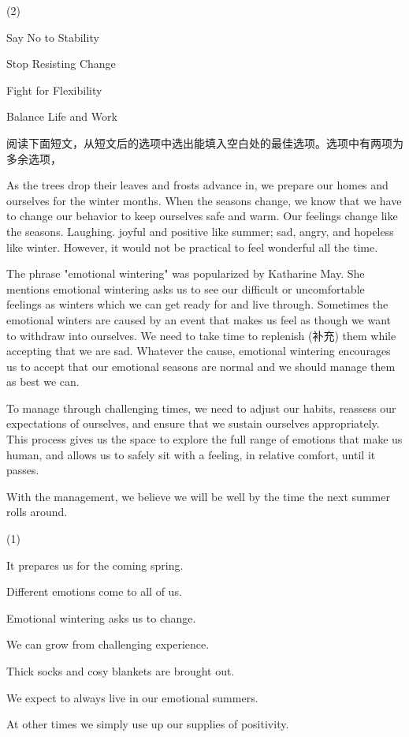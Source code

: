 \documentclass{英语试卷}
\begin{document}
\begin{choices}(2)
  \item Say No to Stability
  \item Stop Resisting Change
  \item Fight for Flexibility
  \item Balance Life and Work
\end{choices}
\par 阅读下面短文，从短文后的选项中选出能填入空白处的最佳选项。选项中有两项为多余选项，\par
\par As the trees drop their leaves and frosts advance in, we prepare our homes and ourselves for the winter months.  When the seasons change, we know that we have to change our behavior to keep ourselves safe and warm. Our feelings change like the seasons. Laughing. joyful and positive like summer; sad, angry, and hopeless like winter.  However, it would not be practical to feel wonderful all the time.\par
\par The phrase "emotional wintering" was popularized by Katharine May. She mentions emotional wintering asks us to see our difficult or uncomfortable feelings as winters which we can get ready for and live through.  Sometimes the emotional winters are caused by an event that makes us feel as though we want to withdraw into ourselves.  We need to take time to replenish (补充) them while accepting that we are sad. Whatever the cause, emotional wintering encourages us to accept that our emotional seasons are normal and we should manage them as best we can.\par
\par {} To manage through challenging times, we need to adjust our habits, reassess our expectations of ourselves, and ensure that we sustain ourselves appropriately. This process gives us the space to explore the full range of emotions that make us human, and allows us to safely sit with a feeling, in relative comfort, until it passes.\par
\par With the management, we believe we will be well by the time the next summer rolls around.\par
\begin{choices}(1)
  \item It prepares us for the coming spring.
  \item Different emotions come to all of us.
  \item Emotional wintering asks us to change.
  \item We can grow from challenging experience.
  \item Thick socks and cosy blankets are brought out.
  \item We expect to always live in our emotional summers.
  \item At other times we simply use up our supplies of positivity.
\end{choices}
\end{document}
